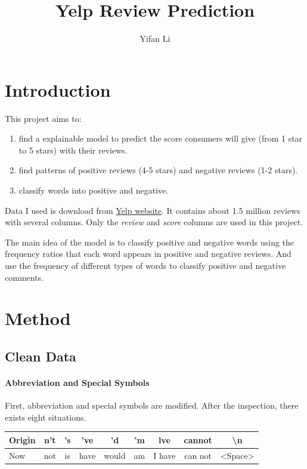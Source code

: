 \documentclass[UTF8]{article}
\title{Yelp Review Prediction}
\author{Yifan Li}
\begin{document}
\maketitle

\section{Introduction}

This project aims to:

\begin{enumerate}
\item find a explainable model to predict the score consumers will give (from 1 star to 5 stars) with their reviews.
\item find patterns of positive reviews (4-5 stars) and negative reviews (1-2 stars).
\item classify words into positive and negative.
\end{enumerate}

Data I used is download from \href{https://www.yelp.com/dataset}{Yelp website}. It contains about 1.5 million reviews with several columns. Only the \textit{review} and \textit{score} columns are used in this project.

The main idea of the model is to classify positive and negative words using the frequency ratios that each word appears in positive and negative reviews. And use the frequency of different types of words to classify positive and negative comments.

\section{Method}

\subsection{Clean Data}

\paragraph{Abbreviation and Special Symbols}

First, abbreviation and special symbols are modified. After the inspection, there exists eight situations.

\begin{table}[!htb]
    \begin{tabular}{|l|c|c|c|c|c|c|c|c|}
    \hline
    Origin & n't & 's & 've  & 'd    & 'm & lve    & cannot  & \textbackslash{}n              \\ \hline
    Now    & not & is & have & would & am & I have & can not & \textless{}Space\textgreater{} \\ \hline
    \end{tabular}
\end{table}
\end{document}
